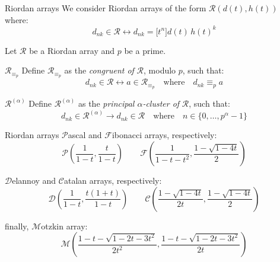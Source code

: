 \documentclass[10pt,serif, professionalfont]{beamer}
\begin{document}
\begin{frame}{Riordan arrays}
    We consider  Riordan arrays of the form $\mathcal{R}\left( d(t), h(t)\right)$
    where:
    \begin{displaymath}
        d_{nk}\in\mathcal{R} \leftrightarrow d_{nk} = \big[t^{n}\big]d(t)\,h(t)^{k}
    \end{displaymath}

    Let $\mathcal{R}$ be a Riordan array and $p$ be a prime.
    
    \begin{block}{$\mathcal{R}_{\equiv_{p}}$}
        Define $\mathcal{R}_{\equiv_{p}}$
        as the \emph{congruent of} $\mathcal{R}$, modulo $p$, such that:
        \begin{displaymath}
            d_{nk}\in\mathcal{R} \leftrightarrow a \in\mathcal{R}_{\equiv_{p}}
            \quad \text{where} \quad d_{nk}\equiv_{p} a
        \end{displaymath}
    \end{block}

    \begin{block}{$\mathcal{R}^{(\alpha)}$}
        Define $\mathcal{R}^{(\alpha)}$
        as the \emph{principal $\alpha$-cluster of} $\mathcal{R}$, such that:
        \begin{displaymath}
            d_{nk}\in\mathcal{R}^{(\alpha)}\rightarrow d_{nk}\in\mathcal{R}
            \quad \text{where}\quad n\in\lbrace0,\ldots,p^{\alpha}-1\rbrace
        \end{displaymath}
    \end{block}
    

\end{frame}

\begin{frame}{Riordan arrays}
    $\mathcal{P}$ascal and $\mathcal{F}$ibonacci arrays, respectively:
    \begin{displaymath}
            \mathcal{P}\left(\frac{1}{1-t},\frac{t}{1-t}\right) \quad\quad 
                \mathcal{F}\left(\frac{1}{1-t-t^2}, \frac{1-\sqrt{1-4t}}{2} \right)
    \end{displaymath}

    $\mathcal{D}$elannoy and $\mathcal{C}$atalan arrays, respectively:
    \begin{displaymath}
        \mathcal{D}\left(\frac{1}{1-t},\frac{t(1+t)}{1-t}\right) \quad\quad
            \mathcal{C}\left(\frac{1-\sqrt{1-4t}}{2t}, \frac{1-\sqrt{1-4t}}{2}\right)
    \end{displaymath}

    finally, $\mathcal{M}$otzkin array:
    \begin{displaymath}
        \mathcal{M}\left(\frac{1-t-\sqrt{1-2t-3t^2}}{2t^2}, \frac{1-t-\sqrt{1-2t-3t^2}}{2t}\right)
    \end{displaymath}
\end{frame}
\end{document}
